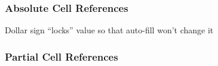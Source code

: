 \documentclass[color=usenames,dvipsnames]{beamer}\usepackage[]{graphicx}\usepackage[]{color}
\begin{document}
\begin{frame}
  \frametitle{Absolute Cell References}
  \begin{center}
    Dollar sign ``locks'' value so that auto-fill won't change it
  \end{center}
\end{frame}


\begin{frame}
  \frametitle{Partial Cell References}
\end{frame}
\end{document}
